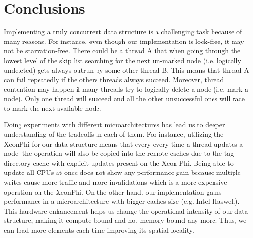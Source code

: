 \section{Conclusions}
\label{sec:con}

Implementing a truly concurrent data structure is a challenging task because of many reasons. For instance, even though our implementation is lock-free, it may not be starvation-free. There could be a thread A that when going through the lowest level of the skip list searching for the next un-marked node (i.e. logically undeleted) gets always outrun by some other thread B. This means that thread A can fail repeatedly if the others threads always succeed. Moreover, thread contention may happen if many threads try to logically delete a node (i.e. mark a node). Only one thread will succeed and all the other unsuccessful ones will race to mark 
the next available node. 

Doing experiments with different microarchitectures has lead us to deeper understanding of the tradeoffs in each of them. For instance, utilizing the XeonPhi for our data structure means that every every time a thread updates a node, the operation will also be copied into the remote caches due to the tag-directory cache with explicit updates present on the Xeon Phi. Being able to update all CPUs at once does not show any performance gain because multiple writes cause more traffic and more invalidations which is a more expensive operation on the XeonPhi. On the other hand, our implementation gains performance in a microarchitecture with bigger caches size (e.g. Intel Haswell). This hardware enhancement helps us change the operational intensity of our data structure, making it compute bound and not memory bound any more. Thus, we can load more elements each time improving its spatial locality.